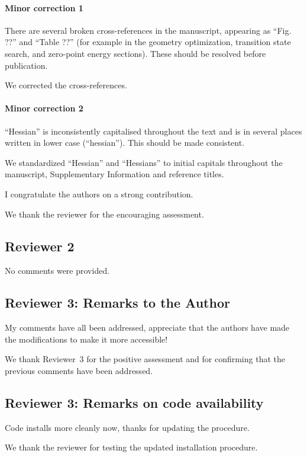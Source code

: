 \documentclass[11pt,letterpaper]{article}
\begin{document}
\paragraph{Minor correction 1}

\noindent There are several broken cross-references in the manuscript, appearing as ``Fig. ??'' and ``Table ??'' (for example in the geometry optimization, transition state search, and zero-point energy sections). These should be resolved before publication.

\vspace{1mm}
{\color{responsecolour}
\noindent We corrected the cross-references.
}

\paragraph{Minor correction 2}

\noindent ``Hessian'' is inconsistently capitalised throughout the text and is in several places written in lower case (``hessian''). This should be made consistent.

\vspace{1mm}
{\color{responsecolour}
\noindent We standardized ``Hessian'' and ``Hessians'' to initial capitals throughout the manuscript, Supplementary Information and reference titles.
}

\vspace{1mm}
\noindent I congratulate the authors on a strong contribution.

\vspace{1mm}
{\color{responsecolour}
\noindent We thank the reviewer for the encouraging assessment.
}

\subsection*{Reviewer 2}

\noindent No comments were provided.

\subsection*{Reviewer 3: Remarks to the Author}

\noindent My comments have all been addressed, appreciate that the authors have made the modifications to make it more accessible!

\vspace{1mm}
{\color{responsecolour}
\noindent We thank Reviewer~3 for the positive assessment and for confirming that the previous comments have been addressed.
}

\subsection*{Reviewer 3: Remarks on code availability}

\noindent Code installs more cleanly now, thanks for updating the procedure.

\vspace{1mm}
{\color{responsecolour}
\noindent We thank the reviewer for testing the updated installation procedure.
}
\end{document}
